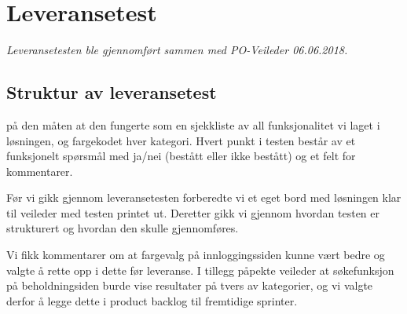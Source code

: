 \chapter{Leveransetest}
\textit{Leveransetesten ble gjennomført sammen med PO-Veileder 06.06.2018.}
\section{\textbf{Struktur av leveransetest}}
 på den måten at den fungerte som en sjekkliste av all funksjonalitet vi laget i løsningen, og fargekodet hver kategori. Hvert punkt i testen består av et funksjonelt spørsmål med ja/nei (bestått eller ikke bestått)  og et felt for kommentarer.

Før vi gikk gjennom leveransetesten forberedte vi et eget bord med løsningen klar til veileder med testen printet ut. Deretter gikk vi gjennom hvordan testen er strukturert og hvordan den skulle gjennomføres.

Vi fikk kommentarer om at fargevalg på innloggingssiden kunne vært bedre og valgte å rette opp i dette før leveranse. I tillegg påpekte veileder at søkefunksjon på beholdningsiden burde vise resultater på tvers av kategorier, og vi valgte derfor å legge dette i product backlog til fremtidige sprinter.
  
